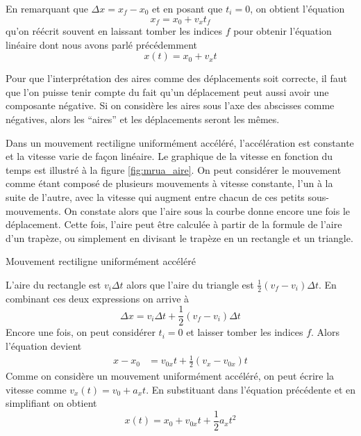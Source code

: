 En remarquant que $\Delta x = x_f - x_0$ et en posant que $t_i = 0$, on obtient
l'équation
\[
  x_f = x_0 + v_xt_f
\]
qu'on réécrit souvent en laissant tomber les indices $f$ pour obtenir
l'équation linéaire dont nous avons parlé précédemment
\[
  x(t) = x_0 + v_x t
\]

Pour que l'interprétation des aires comme des déplacements soit correcte, il
faut que l'on puisse tenir compte du fait qu'un déplacement peut aussi avoir
une composante négative.  Si on considère les aires sous l'axe des abscisses
comme négatives, alors les ``aires'' et les déplacements seront les mêmes.

Dans un mouvement rectiligne uniformément accéléré, l'accélération est
constante et la vitesse varie de façon linéaire.  Le graphique de la vitesse en
fonction du temps est illustré à la figure \ref{fig:mrua_aire}.  On peut
considérer le mouvement comme étant composé de plusieurs mouvements à vitesse
constante, l'un à la suite de l'autre, avec la vitesse qui augment entre chacun
de ces petits sous-mouvements.  On constate alors que l'aire sous la courbe
donne encore une fois le déplacement.  Cette fois, l'aire peut être calculée à
partir de la formule de l'aire d'un trapèze, ou simplement en divisant le
trapèze en un rectangle et un triangle.

\begin{marginfigure}
  \caption{Mouvement rectiligne uniformément accéléré}
  \label{fig:mrua_aire}
\end{marginfigure}

L'aire du rectangle est $v_i\Delta t$ alors que l'aire du triangle est
$\frac{1}{2}(v_f - v_i)\Delta t$.  En combinant ces deux expressions on arrive
à
\[
  \Delta x = v_i \Delta t + \frac{1}{2} (v_f - v_i) \Delta t
\]
Encore une fois, on peut considérer $t_i = 0$ et laisser tomber les indices
$f$.  Alors l'équation devient
\begin{align*}
  x - x_0 &= v_{0x} t + \frac{1}{2} (v_x - v_{0x}) t
\end{align*}
Comme on considère un mouvement uniformément accéléré, on peut écrire la
vitesse comme $v_x(t) = v_0 + a_x t$.  En substituant dans l'équation
précédente et en simplifiant on obtient
\[
  x(t) = x_0 + v_{0x} t + \frac{1}{2} a_x t^2
\]


